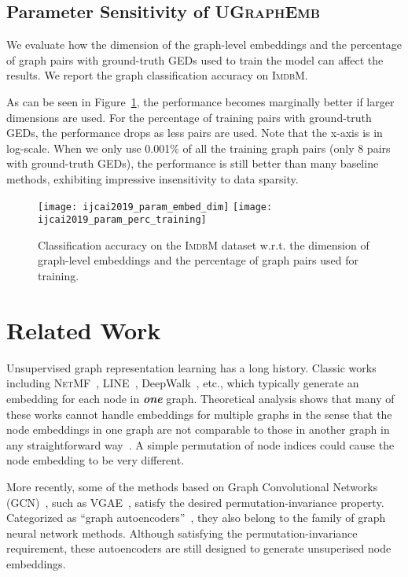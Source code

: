 \documentclass{article}
\newcommand{\model}{\textsc{UGraphEmb}\xspace}
\newcommand{\netmf}{\textsc{NetMF}\xspace}
\newcommand{\gcn}{\textsc{GCN}\xspace}
\newcommand{\imdb}{\textsc{ImdbM}\xspace}
\begin{document}
\subsection{Parameter Sensitivity of \model}

We evaluate how the dimension of the graph-level embeddings and the percentage of graph pairs with ground-truth GEDs used to train the model can affect the results. We report the graph classification accuracy on \imdb. 

As can be seen in Figure~\ref{fig:param}, the performance becomes marginally better if larger dimensions are used. For the percentage of training pairs with ground-truth GEDs, the performance drops as less pairs are used. Note that the x-axis is in log-scale. When we only use 0.001\% of all the training graph pairs (only 8 pairs with ground-truth GEDs), the performance is still better than many baseline methods, exhibiting impressive insensitivity to data sparsity. 


\begin{figure}
   \centering
   {{\texttt{[image: ijcai2019\_param\_embed\_dim]}}}
   {{\texttt{[image: ijcai2019\_param\_perc\_training]}}}
   \caption{Classification accuracy on the \imdb dataset w.r.t. the dimension of graph-level embeddings and the percentage of graph pairs used for training.}
   \label{fig:param}
  \vspace*{-2mm}
\end{figure} \section{Related Work}
\label{sec-related}



Unsupervised graph representation learning has a long history. Classic works including \netmf~\cite{qiu2017network}, LINE~\cite{tang2015line}, DeepWalk~\cite{perozzi2014deepwalk}, etc., which typically generate an embedding for each node in \textbf{\textit{one}} graph. Theoretical analysis shows that many of these works cannot handle embeddings for multiple graphs in the sense that the node embeddings in one graph are not comparable to those in another graph in any straightforward way~\cite{heimann2017generalizing}. A simple permutation of node indices could cause the node embedding to be very different.

More recently, some of the methods based on Graph Convolutional Networks (\gcn)~\cite{defferrard2016convolutional,kipf2016semi}, such as \textsc{VGAE}~\cite{kipf2016variational}, satisfy the desired permutation-invariance property.
Categorized as ``graph autoencoders''~\cite{wu2019comprehensive}, they also belong to the family of graph neural network methods. Although satisfying the permutation-invariance requirement, these autoencoders are still designed to generate unsuperised node embeddings.
\end{document}
